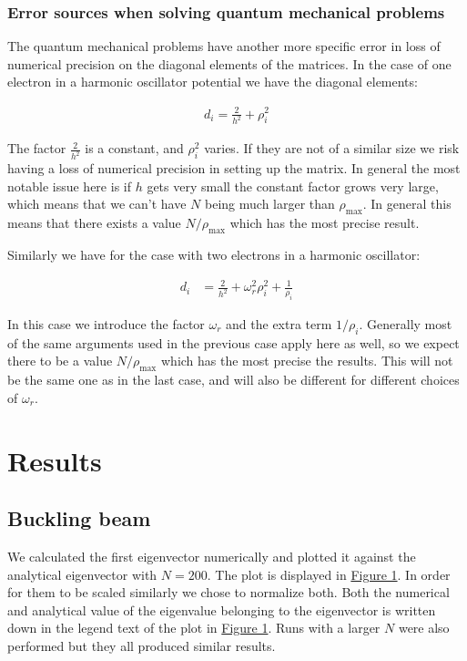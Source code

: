 \documentclass[reprint,english,notitlepage]{revtex4-1}  %
\begin{document}
\subsubsection{Error sources when solving quantum mechanical problems} \label{sec:III:b:i} 

The quantum mechanical problems have another more specific error in loss of numerical precision on the diagonal elements of the matrices. In the case of one electron in a harmonic oscillator potential we have the diagonal elements:

\begin{align*}
d_i = \frac{2}{h^2} + \rho_i^2
\end{align*}

The factor $\frac{2}{h^2}$ is a constant, and $\rho_i^2$ varies. If they are not of a similar size we risk having a loss of numerical precision in setting up the matrix. In general the most notable issue here is if $h$ gets very small the constant factor grows very large, which means that we can't have $N$ being much larger than $\rho_\text{max}$. In general this means that there exists a value $N/\rho_\text{max}$ which has the most precise result. 

Similarly we have for the case with two electrons in a harmonic oscillator:

\begin{align*}
d_i &= \frac{2}{h^2} + \omega_r^2 \rho_i^2 + \frac{1}{\rho_i}
\end{align*}

In this case we introduce the factor $\omega_r$ and the extra term $1/\rho_i$. Generally most of the same arguments used in the previous case apply here as well, so we expect there to be a value $N/\rho_\text{max}$ which has the most precise the results. This will not be the same one as in the last case, and will also be different for different choices of $\omega_r$. 

\newpage

\section{Results} \label{sec:IV}

\subsection{Buckling beam} \label{sec:IV:a}

We calculated the first eigenvector numerically and plotted it against the analytical eigenvector with $N=200$. The plot is displayed in \hyperref[fig:IV:a:1]{Figure 1}. In order for them to be scaled similarly we chose to normalize both. Both the numerical and analytical value of the eigenvalue belonging to the eigenvector is written down in the legend text of the plot in \hyperref[fig:IV:a:1]{Figure 1}. Runs with a larger $N$ were also performed but they all produced similar results.
\end{document}
